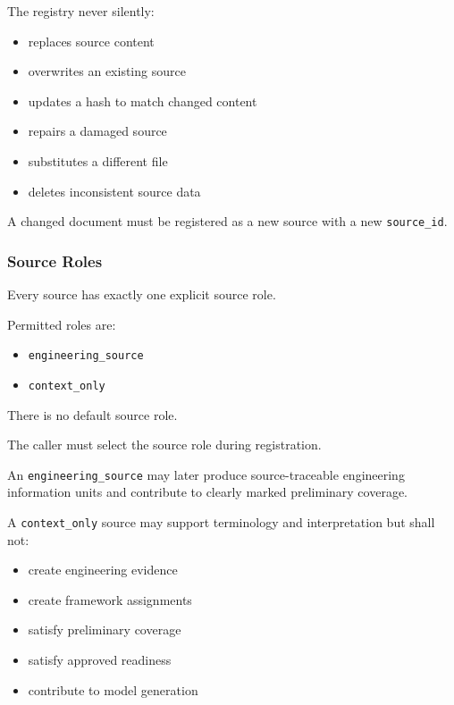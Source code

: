 The registry never silently:

\begin{itemize}
\tightlist
\item
  replaces source content
\item
  overwrites an existing source
\item
  updates a hash to match changed content
\item
  repairs a damaged source
\item
  substitutes a different file
\item
  deletes inconsistent source data
\end{itemize}

A changed document must be registered as a new source with a new \texttt{source\_id}.

\hypertarget{source-roles}{%
\subsubsection{Source Roles}\label{source-roles}}

Every source has exactly one explicit source role.

Permitted roles are:

\begin{itemize}
\tightlist
\item
  \texttt{engineering\_source}
\item
  \texttt{context\_only}
\end{itemize}

There is no default source role.

The caller must select the source role during registration.

An \texttt{engineering\_source} may later produce source-traceable engineering information units and contribute to clearly marked preliminary coverage.

A \texttt{context\_only} source may support terminology and interpretation but shall not:

\begin{itemize}
\tightlist
\item
  create engineering evidence
\item
  create framework assignments
\item
  satisfy preliminary coverage
\item
  satisfy approved readiness
\item
  contribute to model generation
\end{itemize}

